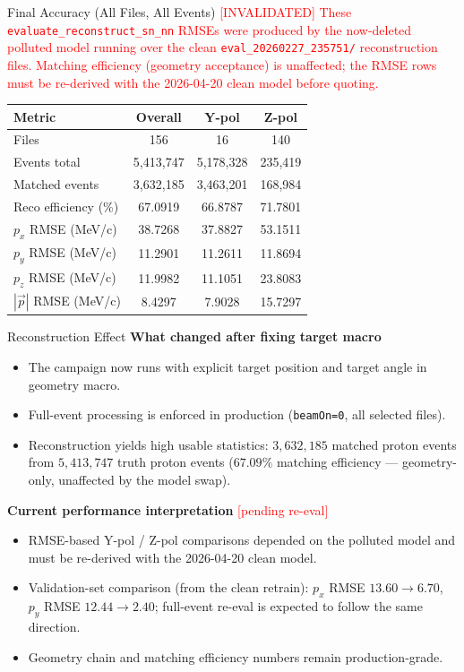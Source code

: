 \documentclass[11pt]{beamer}
\begin{document}
\begin{frame}{Final Accuracy (All Files, All Events) \textcolor{red}{[INVALIDATED]}}
\small
\textcolor{red}{These \texttt{evaluate\_reconstruct\_sn\_nn} RMSEs were produced
by the now-deleted polluted model running over the clean
\texttt{eval\_20260227\_235751/} reconstruction files. Matching efficiency
(geometry acceptance) is unaffected; the RMSE rows must be re-derived with
the 2026-04-20 clean model before quoting.}
\begin{table}
\centering
\begin{tabular}{lccc}
\toprule
Metric & Overall & Y-pol & Z-pol \\
\midrule
Files & 156 & 16 & 140 \\
Events total & 5,413,747 & 5,178,328 & 235,419 \\
Matched events & 3,632,185 & 3,463,201 & 168,984 \\
Reco efficiency (\%) & 67.0919 & 66.8787 & 71.7801 \\
\(p_x\) RMSE (MeV/c) & 38.7268 & 37.8827 & 53.1511 \\
\(p_y\) RMSE (MeV/c) & 11.2901 & 11.2611 & 11.8694 \\
\(p_z\) RMSE (MeV/c) & 11.9982 & 11.1051 & 23.8083 \\
\(|\vec{p}|\) RMSE (MeV/c) & 8.4297 & 7.9028 & 15.7297 \\
\bottomrule
\end{tabular}
\end{table}
\end{frame}

\begin{frame}{Reconstruction Effect}
\textbf{What changed after fixing target macro}
\begin{itemize}
\item The campaign now runs with explicit target position and target angle in geometry macro.
\item Full-event processing is enforced in production (\texttt{beamOn=0}, all selected files).
\item Reconstruction yields high usable statistics:
\(3{,}632{,}185\) matched proton events from \(5{,}413{,}747\) truth proton events
(\(67.09\%\) matching efficiency --- geometry-only, unaffected by the model swap).
\end{itemize}

\textbf{Current performance interpretation} \textcolor{red}{[pending re-eval]}
\begin{itemize}
\item RMSE-based Y-pol / Z-pol comparisons depended on the polluted model
and must be re-derived with the 2026-04-20 clean model.
\item Validation-set comparison (from the clean retrain): \(p_x\) RMSE
\(13.60\rightarrow 6.70\), \(p_y\) RMSE \(12.44\rightarrow 2.40\); full-event
re-eval is expected to follow the same direction.
\item Geometry chain and matching efficiency numbers remain production-grade.
\end{itemize}
\end{frame}
\end{document}
